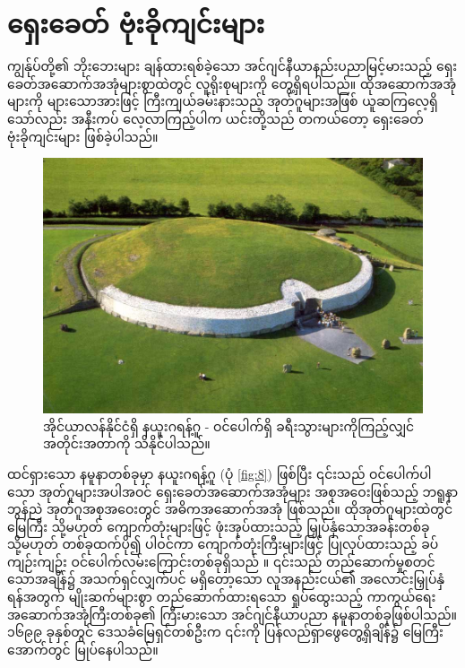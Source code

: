 \documentclass[10pt,twocolumn,letterpaper]{article}
\begin{document}
\section{ရှေးခေတ် ဗုံးခိုကျင်းများ}

ကျွန်ုပ်တို့၏ ဘိုးဘေးများ ချန်ထားရစ်ခဲ့သော အင်ဂျင်နီယာနည်းပညာမြင့်မားသည့် ရှေးခေတ်အဆောက်အအုံများစွာထဲတွင် လူရိုးစုများကို တွေ့ရှိရပါသည်။ ထိုအဆောက်အအုံများကို များသောအားဖြင့် ကြီးကျယ်ခမ်းနားသည့် အုတ်ဂူများအဖြစ် ယူဆကြလေ့ရှိသော်လည်း အနီးကပ် လေ့လာကြည့်ပါက ယင်းတို့သည် တကယ်တော့ ရှေးခေတ် ဗုံးခိုကျင်းများ ဖြစ်ခဲ့ပါသည်။

\begin{figure}[b]
\begin{center}
   \includegraphics[width=1\linewidth]{ww19.jpg}
\end{center}
   \caption{အိုင်ယာလန်နိုင်ငံရှိ နယူးဂရန့်ဂူ - ဝင်ပေါက်ရှိ ခရီးသွားများကိုကြည့်လျှင် အတိုင်းအတာကို သိနိုင်ပါသည်။}
\label{fig:8}
\label{fig:onecol}
\end{figure}

ထင်ရှားသော နမူနာတစ်ခုမှာ နယူးဂရန့်ဂူ (ပုံ \ref{fig:8}) ဖြစ်ပြီး ၎င်းသည် ဝင်ပေါက်ပါသော အုတ်ဂူများအပါအဝင် ရှေးခေတ်အဆောက်အအုံများ အစုအဝေးဖြစ်သည့် ဘရူနာဘွန်ညဲ အုတ်ဂူအစုအဝေးတွင် အဓိကအဆောက်အအုံ ဖြစ်သည်။ ထိုအုတ်ဂူများထဲတွင် မြေကြီး သို့မဟုတ် ကျောက်တုံးများဖြင့် ဖုံးအုပ်ထားသည့် မြှုပ်နှံသောအခန်းတစ်ခု သို့မဟုတ် တစ်ခုထက်ပို၍ ပါဝင်ကာ ကျောက်တုံးကြီးများဖြင့် ပြုလုပ်ထားသည့် ခပ်ကျဉ်းကျဉ်း ဝင်ပေါက်လမ်းကြောင်းတစ်ခုရှိသည် \cite{70}။ ၎င်းသည် တည်ဆောက်မှုစတင်သောအချိန်၌ အသက်ရှင်လျှက်ပင် မရှိတော့သော လူအနည်းငယ်၏ အလောင်းမြှုပ်နှံရန်အတွက် မျိုးဆက်များစွာ တည်ဆောက်ထားရသော ရှုပ်ထွေးသည့် ကာကွယ်ရေး အဆောက်အအုံကြီးတစ်ခု၏ ကြီးမားသော အင်ဂျင်နီယာပညာ နမူနာတစ်ခုဖြစ်ပါသည်။ ၁၆၉၉ ခုနှစ်တွင် ဒေသခံမြေရှင်တစ်ဦးက ၎င်းကို ပြန်လည်ရှာဖွေတွေ့ရှိချိန်၌ မြေကြီးအောက်တွင် မြုပ်နေပါသည်။
\end{document}

